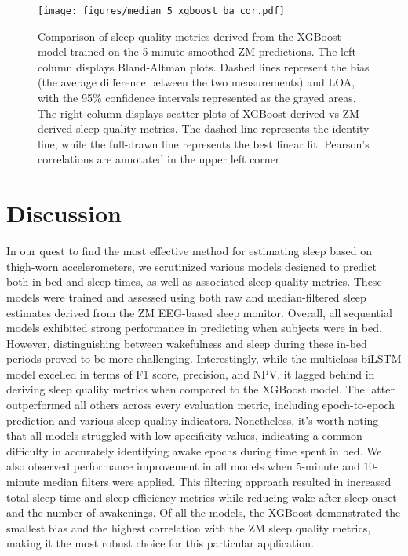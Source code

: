 \documentclass[
  9pt,
]{scrbook}
\begin{document}
\begin{figure}

{\centering \texttt{[image: figures/median\_5\_xgboost\_ba\_cor.pdf]}

}

\caption{\label{fig-xgb_ba_cor}Comparison of sleep quality metrics
derived from the XGBoost model trained on the 5-minute smoothed ZM
predictions. The left column displays Bland-Altman plots. Dashed lines
represent the bias (the average difference between the two measurements)
and LOA, with the 95\% confidence intervals represented as the grayed
areas. The right column displays scatter plots of XGBoost-derived vs
ZM-derived sleep quality metrics. The dashed line represents the
identity line, while the full-drawn line represents the best linear fit.
Pearson's correlations are annotated in the upper left corner}

\end{figure}

\hypertarget{discussion-2}{%
\section{Discussion}\label{discussion-2}}

In our quest to find the most effective method for estimating sleep
based on thigh-worn accelerometers, we scrutinized various models
designed to predict both in-bed and sleep times, as well as associated
sleep quality metrics. These models were trained and assessed using both
raw and median-filtered sleep estimates derived from the ZM EEG-based
sleep monitor. Overall, all sequential models exhibited strong
performance in predicting when subjects were in bed. However,
distinguishing between wakefulness and sleep during these in-bed periods
proved to be more challenging. Interestingly, while the multiclass
biLSTM model excelled in terms of F1 score, precision, and NPV, it
lagged behind in deriving sleep quality metrics when compared to the
XGBoost model. The latter outperformed all others across every
evaluation metric, including epoch-to-epoch prediction and various sleep
quality indicators. Nonetheless, it's worth noting that all models
struggled with low specificity values, indicating a common difficulty in
accurately identifying awake epochs during time spent in bed. We also
observed performance improvement in all models when 5-minute and
10-minute median filters were applied. This filtering approach resulted
in increased total sleep time and sleep efficiency metrics while
reducing wake after sleep onset and the number of awakenings. Of all the
models, the XGBoost demonstrated the smallest bias and the highest
correlation with the ZM sleep quality metrics, making it the most robust
choice for this particular application.
\end{document}
